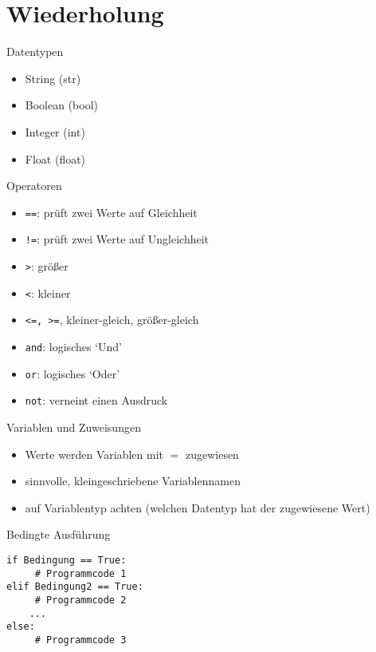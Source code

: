 \section{Wiederholung}

\begin{frame}[fragile]{Datentypen}
	\begin{itemize}
		\item String (str)
		\item Boolean (bool)
		\item Integer (int)
		\item Float (float)
	\end{itemize}
\end{frame}

\begin{frame}[fragile]{Operatoren}
	\begin{itemize}
		\item \texttt{==}: prüft zwei Werte auf Gleichheit
		\item \texttt{!=}: prüft zwei Werte auf Ungleichheit
		\item \texttt{>}: größer
		\item \texttt{<}: kleiner 
		\item \texttt{<=, >=}, kleiner-gleich, größer-gleich
		\item \texttt{and}: logisches `Und'
		\item \texttt{or}: logisches `Oder'
		\item \texttt{not}: verneint einen Ausdruck
	\end{itemize}
\end{frame}


\begin{frame}[fragile]{Variablen und Zuweisungen}
	\begin{itemize}
		\item Werte werden Variablen mit $=$ zugewiesen
		\item sinnvolle, kleingeschriebene Variablennamen
		\item auf Variablentyp achten (welchen Datentyp hat der zugewiesene Wert)
	\end{itemize}
\end{frame}

\begin{frame}[fragile]{Bedingte Ausführung}
	\begin{lstlisting}
if Bedingung == True:
     # Programmcode 1
elif Bedingung2 == True:
     # Programmcode 2
	...
else:
     # Programmcode 3
	\end{lstlisting}
\end{frame}

